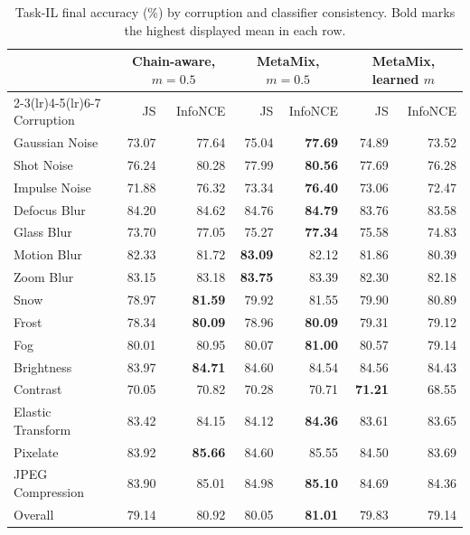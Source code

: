 \documentclass[10pt,twocolumn,letterpaper]{article}
\begin{document}
\begin{table}[h]
      \centering\small
      \begin{tabular}{lrrrrrr}
            \toprule
            & \multicolumn{2}{c}{Chain-aware, $m=0.5$} & \multicolumn{2}{c}{MetaMix, $m=0.5$} & \multicolumn{2}{c}{MetaMix, learned $m$} \\
            \cmidrule(lr){2-3}\cmidrule(lr){4-5}\cmidrule(lr){6-7}
            Corruption & JS & InfoNCE & JS & InfoNCE & JS & InfoNCE \\
            \midrule
            Gaussian Noise & 73.07 & 77.64 & 75.04 & \textbf{77.69} & 74.89 & 73.52 \\
            Shot Noise & 76.24 & 80.28 & 77.99 & \textbf{80.56} & 77.69 & 76.28 \\
            Impulse Noise & 71.88 & 76.32 & 73.34 & \textbf{76.40} & 73.06 & 72.47 \\
            Defocus Blur & 84.20 & 84.62 & 84.76 & \textbf{84.79} & 83.76 & 83.58 \\
            Glass Blur & 73.70 & 77.05 & 75.27 & \textbf{77.34} & 75.58 & 74.83 \\
            Motion Blur & 82.33 & 81.72 & \textbf{83.09} & 82.12 & 81.86 & 80.39 \\
            Zoom Blur & 83.15 & 83.18 & \textbf{83.75} & 83.39 & 82.30 & 82.18 \\
            Snow & 78.97 & \textbf{81.59} & 79.92 & 81.55 & 79.90 & 80.89 \\
            Frost & 78.34 & \textbf{80.09} & 78.96 & \textbf{80.09} & 79.31 & 79.12 \\
            Fog & 80.01 & 80.95 & 80.07 & \textbf{81.00} & 80.57 & 79.14 \\
            Brightness & 83.97 & \textbf{84.71} & 84.60 & 84.54 & 84.56 & 84.43 \\
            Contrast & 70.05 & 70.82 & 70.28 & 70.71 & \textbf{71.21} & 68.55 \\
            Elastic Transform & 83.42 & 84.15 & 84.12 & \textbf{84.36} & 83.61 & 83.65 \\
            Pixelate & 83.92 & \textbf{85.66} & 84.60 & 85.55 & 84.50 & 83.69 \\
            JPEG Compression & 83.90 & 85.01 & 84.98 & \textbf{85.10} & 84.69 & 84.36 \\
            \midrule
            Overall & 79.14 & 80.92 & 80.05 & \textbf{81.01} & 79.83 & 79.14 \\
            \bottomrule\end{tabular}
      \caption{Task-IL final accuracy (\%) by corruption and classifier consistency. Bold marks the highest displayed mean in each row.}\label{tab:task-detail}\end{table}
\end{document}
